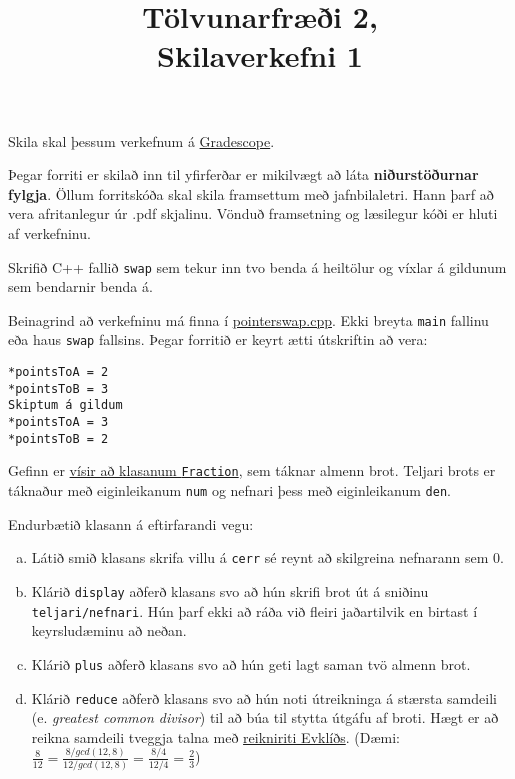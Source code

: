 \documentclass{article}
\title{Tölvunarfræði 2, \semester \\ Skilaverkefni 1}
\author{}
\begin{document}
\maketitle
{}

Skila skal þessum verkefnum á \href{https://gradescope.com/courses/14122}{Gradescope}.

Þegar forriti er skilað inn til yfirferðar er mikilvægt að láta \textbf{niðurstöðurnar fylgja}. Öllum forritskóða skal skila framsettum með jafnbilaletri. Hann þarf að vera afritanlegur úr .pdf skjalinu. Vönduð framsetning og læsilegur kóði er hluti af verkefninu.

\question

Skrifið C++ fallið \texttt{swap} sem tekur inn tvo benda á heiltölur og víxlar á gildunum sem bendarnir benda á.

Beinagrind að verkefninu má finna í \href{https://raw.githubusercontent.com/Ernir/kennsluefni/master/T2/Code/w2/pointerswap.cpp}{pointerswap.cpp}. Ekki breyta \texttt{main} fallinu eða haus \texttt{swap} fallsins. Þegar forritið er keyrt ætti útskriftin að vera:

\begin{verbatim}
*pointsToA = 2
*pointsToB = 3
Skiptum á gildum
*pointsToA = 3
*pointsToB = 2    
\end{verbatim}

\question 

Gefinn er \href{https://raw.githubusercontent.com/Ernir/kennsluefni/master/T2/Code/w2/fraction.cpp}{vísir að klasanum \texttt{Fraction}}, sem táknar almenn brot. Teljari brots er táknaður með eiginleikanum \texttt{num} og nefnari þess með eiginleikanum \texttt{den}.

Endurbætið klasann á eftirfarandi vegu:

\begin{enumerate}[a)]
    \item Látið smið klasans skrifa villu á \texttt{cerr} sé reynt að skilgreina nefnarann sem 0.
    \item Klárið \texttt{display} aðferð klasans svo að hún skrifi brot út á sniðinu \texttt{teljari/nefnari}. Hún þarf ekki að ráða við fleiri jaðartilvik en birtast í keyrsludæminu að neðan.
    \item Klárið \texttt{plus} aðferð klasans svo að hún geti lagt saman tvö almenn brot.
    \item Klárið \texttt{reduce} aðferð klasans svo að hún noti útreikninga á stærsta samdeili (e. \emph{greatest common divisor}) til að búa til stytta útgáfu af broti. Hægt er að reikna samdeili tveggja talna með \href{https://en.wikipedia.org/wiki/Euclidean_algorithm}{reikniriti Evklíðs}. (Dæmi: $\frac{8}{12} = \frac{8/gcd(12,8)}{12/gcd(12,8)} = \frac{8/4}{12/4} = \frac{2}{3}$)
\end{enumerate}
\end{document}
